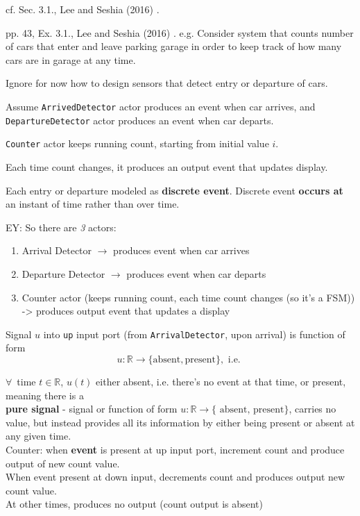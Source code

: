 \documentclass[10pt]{amsart}
\begin{document}
cf. Sec. 3.1., Lee and Seshia (2016) \cite{LeSe2016}. 

pp. 43, Ex. 3.1., Lee and Seshia (2016) \cite{LeSe2016}. e.g. Consider system that counts number of cars that enter and leave parking garage in order to keep track of how many cars are in garage at any time. 

Ignore for now how to design sensors that detect entry or departure of cars.

Assume \texttt{ArrivedDetector} actor produces an event when car arrives, and \texttt{DepartureDetector} actor produces an event when car departs.

\texttt{Counter} actor keeps running count, starting from initial value $i$. 

Each time count changes, it produces an output event that updates display.

Each entry or departure modeled as \textbf{discrete event}. Discrete event \textbf{occurs at} an instant of time rather than over time.

EY: So there are \emph{3} actors:

\begin{enumerate}
	\item Arrival Detector $\to$ produces event when car arrives
	\item Departure Detector $\to$ produces event when car departs
	\item Counter actor (keeps running count, each time count changes (so it's a FSM)) -> produces output event that updates a display
\end{enumerate}


Signal $u$ into \texttt{up} input port (from \texttt{ArrivalDetector}, upon arrival) is function of form
\[
u : \mathbb{R} \to \lbrace \text{absent}, \text{present} \rbrace, \text{ i.e. }
\]

$\forall \, $ time $t\in \mathbb{R}$, $u(t) $ either absent, i.e. there's no event at that time, or present, meaning there is a \\

\textbf{pure signal} - signal or function of form $u:\mathbb{R} \to \lbrace \text{ absent, present} \rbrace$, carries no value, but instead provides all its information by either being present or absent at any given time. \\

Counter: when \textbf{event} is present at up input port, increment count and produce output of new count value. \\
When event present at down input, decrements count and produces output new count value. \\
At other times, produces no output (count output is absent) \\
\end{document}
